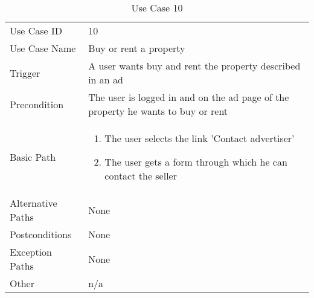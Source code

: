 \begin{table}[H]
\centering
\label{table-use-case-10}
\begin{tabular}{|p{3cm}|p{10cm}}
Use Case ID       & 10                                                           \\
Use Case Name     & Buy or rent a property                                                         \\
Trigger           & A user wants buy and rent the property described in an ad \\
Precondition      & The user is logged in and on the ad page of the property he wants to buy or rent\\
Basic Path        & \begin{enumerate}
\item The user selects the link 'Contact advertiser'
\item The user gets a form through which he can contact the seller
\end{enumerate} 
     \\
Alternative Paths & None                          \\
Postconditions    & None				\\
Exception Paths   & None            \\
Other             & n/a                                                                                                                                                                                                        
\end{tabular}
\caption{Use Case 10}
\end{table}

